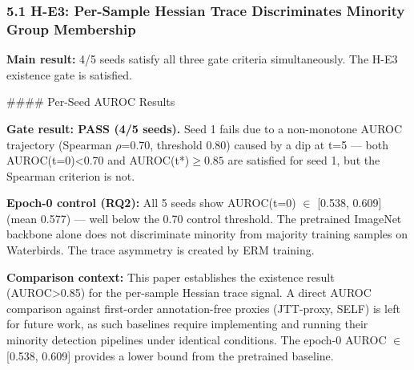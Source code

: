 
\subsubsection{5.1 H-E3: Per-Sample Hessian Trace Discriminates Minority Group Membership}

\textbf{Main result:} 4/5 seeds satisfy all three gate criteria simultaneously. The H-E3 existence gate is satisfied.

\#\#\#\# Per-Seed AUROC Results

\begin{table}[htbp]
\centering
{}
\end{table}

\textbf{Gate result: PASS (4/5 seeds).} Seed 1 fails due to a non-monotone AUROC trajectory (Spearman $\rho$=0.70, threshold 0.80) caused by a dip at t=5 --- both AUROC(t=0)<0.70 and AUROC(t*)$\geq 0.85$ are satisfied for seed 1, but the Spearman criterion is not.

\textbf{Epoch-0 control (RQ2):} All 5 seeds show AUROC(t=0) $\in$ [0.538, 0.609] (mean 0.577) --- well below the 0.70 control threshold. The pretrained ImageNet backbone alone does not discriminate minority from majority training samples on Waterbirds. The trace asymmetry is created by ERM training.

\textbf{Comparison context:} This paper establishes the existence result (AUROC>0.85) for the per-sample Hessian trace signal. A direct AUROC comparison against first-order annotation-free proxies (JTT-proxy, SELF) is left for future work, as such baselines require implementing and running their minority detection pipelines under identical conditions. The epoch-0 AUROC $\in$ [0.538, 0.609] provides a lower bound from the pretrained baseline.

